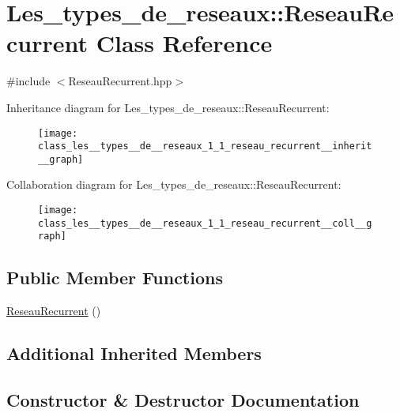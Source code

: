\hypertarget{class_les__types__de__reseaux_1_1_reseau_recurrent}{}\section{Les\+\_\+types\+\_\+de\+\_\+reseaux\+:\+:Reseau\+Recurrent Class Reference}
\label{class_les__types__de__reseaux_1_1_reseau_recurrent}


{\ttfamily \#include $<$Reseau\+Recurrent.\+hpp$>$}



Inheritance diagram for Les\+\_\+types\+\_\+de\+\_\+reseaux\+:\+:Reseau\+Recurrent\+:\nopagebreak
\begin{figure}[H]
\begin{center}
\leavevmode
\texttt{[image: class\_les\_\_types\_\_de\_\_reseaux\_1\_1\_reseau\_recurrent\_\_inherit\_\_graph]}
\end{center}
\end{figure}


Collaboration diagram for Les\+\_\+types\+\_\+de\+\_\+reseaux\+:\+:Reseau\+Recurrent\+:\nopagebreak
\begin{figure}[H]
\begin{center}
\leavevmode
\texttt{[image: class\_les\_\_types\_\_de\_\_reseaux\_1\_1\_reseau\_recurrent\_\_coll\_\_graph]}
\end{center}
\end{figure}
\subsection*{Public Member Functions}
\begin{DoxyCompactItemize}
\item 
\hyperlink{class_les__types__de__reseaux_1_1_reseau_recurrent_a8c63bfcee7b0e29ec1499327366861d6}{Reseau\+Recurrent} ()
\end{DoxyCompactItemize}
\subsection*{Additional Inherited Members}


\subsection{Constructor \& Destructor Documentation}
\mbox{\label{class_les__types__de__reseaux_1_1_reseau_recurrent_a8c63bfcee7b0e29ec1499327366861d6}} 
